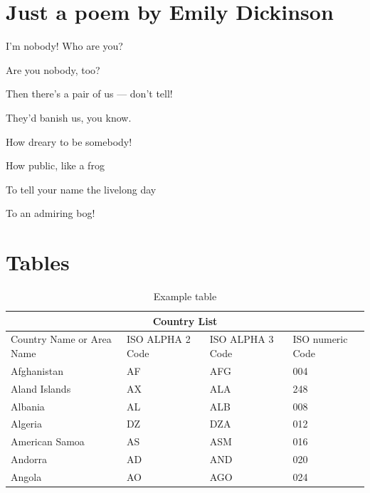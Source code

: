 \documentclass{imc-inf}
\begin{document}
\section {Just a poem by Emily Dickinson}

I'm nobody! Who are you?

Are you nobody, too?

Then there's a pair of us — don't tell!

They'd banish us, you know.

How dreary to be somebody!

How public, like a frog

To tell your name the livelong day

To an admiring bog!
	
\section{Tables}

\begin{table}[ht]
\begin{tabular}{ |p{3cm}||p{3cm}|p{3cm}|p{3cm}|  }
	\hline
	\multicolumn{4}{|c|}{Country List} \\
	\hline
	Country Name     or Area Name& ISO ALPHA 2 Code &ISO ALPHA 3 Code&ISO numeric Code\\
	\hline
	Afghanistan   & AF    &AFG&   004\\
	Aland Islands&   AX  & ALA   &248\\
	Albania &AL & ALB&  008\\
	Algeria    &DZ & DZA&  012\\
	American Samoa&   AS  & ASM&016\\
	Andorra& AD  & AND   &020\\
	Angola& AO  & AGO&024\\
	\hline
\end{tabular}
\caption{\label{tab:table-name}Example table}
\end{table}



%
%
%
%
%

\backmatter%
	
 \typeout{}
	
	
\end{document}
